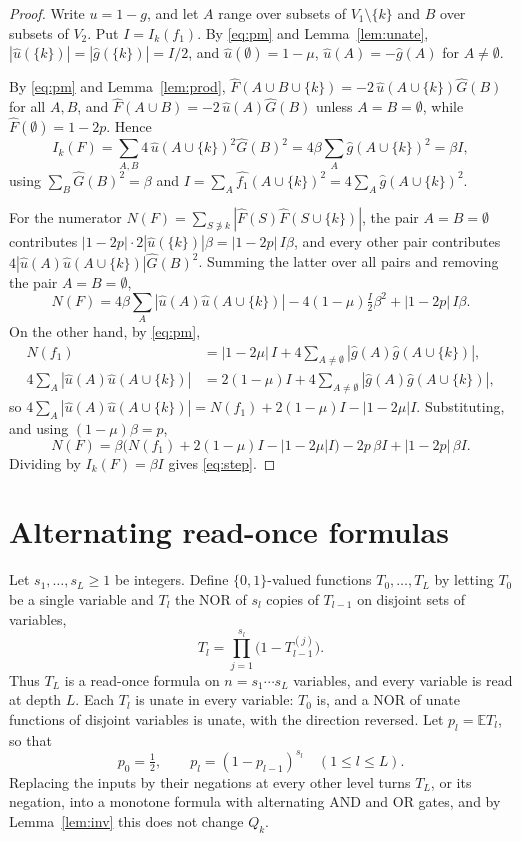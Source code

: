 \documentclass[11pt]{amsart}
\theoremstyle{definition}\newtheorem{definition}[theorem]{Definition}
\theoremstyle{remark}\newtheorem{remark}[theorem]{Remark}
\newcommand{\E}{\mathbb{E}}
\begin{document}
\begin{proof}
Write $u=1-g$, and let $A$ range over subsets of $V_1\setminus\{k\}$ and $B$ over subsets of $V_2$. Put
$I=I_k(f_1)$. By \eqref{eq:pm} and Lemma~\ref{lem:unate}, $|\widehat u(\{k\})|=|\widehat g(\{k\})|=I/2$, and
$\widehat u(\emptyset)=1-\mu$, $\widehat u(A)=-\widehat g(A)$ for $A\ne\emptyset$.

By \eqref{eq:pm} and Lemma~\ref{lem:prod}, $\widehat F(A\cup B\cup\{k\})=-2\,\widehat u(A\cup\{k\})\widehat G(B)$
for all $A,B$, and $\widehat F(A\cup B)=-2\,\widehat u(A)\widehat G(B)$ unless $A=B=\emptyset$, while
$\widehat F(\emptyset)=1-2p$. Hence
\[
I_k(F)=\sum_{A,B}4\,\widehat u(A\cup\{k\})^2\widehat G(B)^2=4\beta\sum_A\widehat g(A\cup\{k\})^2=\beta I ,
\]
using $\sum_B\widehat G(B)^2=\beta$ and $I=\sum_A\widehat{f_1}(A\cup\{k\})^2=4\sum_A\widehat g(A\cup\{k\})^2$.

For the numerator $N(F)=\sum_{S\not\ni k}|\widehat F(S)\widehat F(S\cup\{k\})|$, the pair $A=B=\emptyset$ contributes
$|1-2p|\cdot2|\widehat u(\{k\})|\beta=|1-2p|\,I\beta$, and every other pair contributes
$4|\widehat u(A)\widehat u(A\cup\{k\})|\widehat G(B)^2$. Summing the latter over all pairs and removing the pair
$A=B=\emptyset$,
\[
N(F)=4\beta\sum_A|\widehat u(A)\widehat u(A\cup\{k\})|-4(1-\mu)\tfrac I2\beta^2+|1-2p|\,I\beta .
\]
On the other hand, by \eqref{eq:pm},
\begin{align*}
N(f_1)&=|1-2\mu|\,I+4\sum_{A\ne\emptyset}|\widehat g(A)\widehat g(A\cup\{k\})|,\\
4\sum_A|\widehat u(A)\widehat u(A\cup\{k\})|&=2(1-\mu)I+4\sum_{A\ne\emptyset}|\widehat g(A)\widehat g(A\cup\{k\})| ,
\end{align*}
so $4\sum_A|\widehat u(A)\widehat u(A\cup\{k\})|=N(f_1)+2(1-\mu)I-|1-2\mu|I$. Substituting, and using
$(1-\mu)\beta=p$,
\[
N(F)=\beta\bigl(N(f_1)+2(1-\mu)I-|1-2\mu|I\bigr)-2p\,\beta I+|1-2p|\,\beta I .
\]
Dividing by $I_k(F)=\beta I$ gives \eqref{eq:step}.
\end{proof}

\section{Alternating read-once formulas}\label{sec:trees}

Let $s_1,\dots,s_L\ge1$ be integers. Define $\{0,1\}$-valued functions $T_0,\dots,T_L$ by letting $T_0$ be a single
variable and $T_l$ the NOR of $s_l$ copies of $T_{l-1}$ on disjoint sets of variables,
\[
T_l=\prod_{j=1}^{s_l}\bigl(1-T_{l-1}^{(j)}\bigr).
\]
Thus $T_L$ is a read-once formula on $n=s_1\cdots s_L$ variables, and every variable is read at depth $L$. Each $T_l$ is
unate in every variable: $T_0$ is, and a NOR of unate functions of disjoint variables is unate, with the direction
reversed. Let $p_l=\E T_l$, so that
\[
p_0=\tfrac12,\qquad p_l=(1-p_{l-1})^{s_l}\quad(1\le l\le L).
\]
Replacing the inputs by their negations at every other level turns $T_L$, or its negation, into a monotone formula
with alternating AND and OR gates, and by Lemma~\ref{lem:inv} this does not change $Q_k$.
\end{document}
